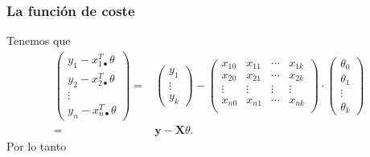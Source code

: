 \documentclass[aspectratio=169]{beamer}
\begin{document}
\begin{frame}\frametitle{La función de coste}
Tenemos que 
\begin{align*}
\left(
\begin{array}{l}
y_1-x_{1\bullet}^T\theta\\y_2-x_{2\bullet}^T\theta\\\vdots\\y_n-x_{n\bullet}^T\theta  
\end{array}\right)
=& \left(\begin{array}{l}
y_1\\\vdots\\y_k  
\end{array}\right) - \left(
\begin{array}{llll}
x_{10}&x_{11}&\cdots&x_{1k}\\
x_{20}&x_{21}&\cdots&x_{2k}\\
\vdots&\vdots&\vdots&\vdots\\
x_{n0}&x_{n1}&\cdots&x_{nk}\\
\end{array}\right)\cdot \left(
\begin{array}{l}
\theta_0\\\theta_1\\\vdots\\\theta_k  
\end{array}\right)\\
=& \mathbf{y}-\mathbf{X}\theta.   
\end{align*}
 Por lo tanto
\begin{center}
\end{center}
\end{frame}
\end{document}
